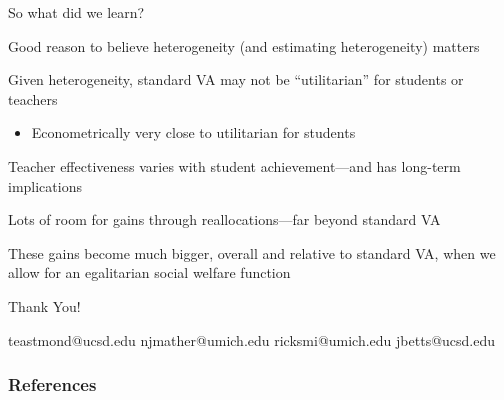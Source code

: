 \documentclass[t,aspectratio=169,11pt]{beamer}
\begin{document}
\begin{frame}{So what did we learn?}

\begin{wideitemize}
\item Good reason to believe heterogeneity (and estimating heterogeneity) matters
\item<2-> Given heterogeneity, standard VA may not be ``utilitarian'' for students or teachers
\begin{itemize}
    \item Econometrically very close to utilitarian for students
\end{itemize}
\item<3-> Teacher effectiveness varies with student achievement---and has long-term implications
\item<4-> Lots of room for gains through reallocations---far beyond standard VA
\item<5-> These gains become much bigger, overall and relative to standard VA, when we allow for an egalitarian social welfare function
\end{wideitemize}

\end{frame}


\begin{frame}[c,noframenumbering]
\centering
\Huge{\centerline{Thank You!}}

\normalsize  teastmond@ucsd.edu \hspace{1em} njmather@umich.edu \hspace{1em} ricksmi@umich.edu \hspace{1em} jbetts@ucsd.edu

\end{frame}



\begin{frame}
\frametitle{References}
\tiny

\end{frame}
\end{document}
